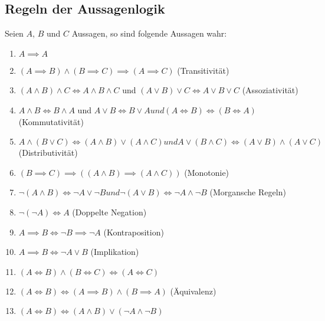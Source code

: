 \documentclass{article}
\begin{document}
        \subsection*{Regeln der Aussagenlogik}
		Seien $A$, $B$ und $C$ Aussagen, so sind folgende Aussagen wahr:
            \begin{enumerate}
                \item $A\implies A$
                \item $(A\implies B) \land (B \implies C)\implies (A\implies C)$ (Transitivität)
                \item$(A\land B)\land C \iff A\land B\land C$ und $(A\lor B)\lor C \iff A\lor B\lor C$ (Assoziativität)
                \item $A\land B \iff B\land A$ und $A\lor B \iff B\lor A und (A\iff B) \iff (B\iff A)$ (Kommutativität)
                \item $A\land (B\lor C)\iff (A\land B) \lor (A\land C) und A\lor (B\land C)\iff (A\lor B) \land (A\lor C)$ (Distributivität)
                \item $(B\implies C)\implies ((A\land B)\implies (A \land C))$  (Monotonie)
                \item $\lnot (A\land B)\iff \lnot A\lor \lnot B und \lnot (A\lor B)\iff \lnot A\land \lnot B$  (Morgansche Regeln)
                \item $\lnot(\lnot A)\iff A$ (Doppelte Negation)
		\item $A\implies B \iff \lnot B\implies \lnot A$ (Kontraposition)
  		\item $A\implies B \iff \lnot A\lor B$ (Implikation)
    		\item $(A\iff B) \land (B\iff C) \iff (A\iff C)$
      		\item $(A\iff B) \iff (A\implies B)\land (B\implies A)$ (Äquivalenz)
		\item $(A\iff B) \iff (A\land B)\lor (\lnot A\land \lnot B)$

            \end{enumerate}
\end{document}
